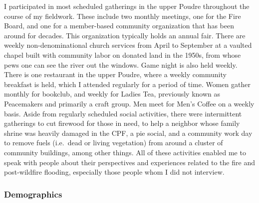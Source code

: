\documentclass[
]{article}
\begin{document}
I participated in most scheduled gatherings in the upper Poudre throughout the course of my fieldwork. These include two monthly meetings, one for the Fire Board, and one for a member-based community organization that has been around for decades. This organization typically holds an annual fair. There are weekly non-denominational church services from April to September at a vaulted chapel built with community labor on donated land in the 1950s, from whose pews one can see the river out the windows. Game night is also held weekly. There is one restaurant in the upper Poudre, where a weekly community breakfast is held, which I attended regularly for a period of time. Women gather monthly for bookclub, and weekly for Ladies Tea, previously known as Peacemakers and primarily a craft group. Men meet for Men's Coffee on a weekly basis. Aside from regularly scheduled social activities, there were intermittent gatherings to cut firewood for those in need, to help a neighbor whose family shrine was heavily damaged in the CPF, a pie social, and a community work day to remove fuels (i.e.~dead or living vegetation) from around a cluster of community buildings, among other things. All of these activities enabled me to speak with people about their perspectives and experiences related to the fire and post-wildfire flooding, especially those people whom I did not interview.

\subsubsection{Demographics}\label{demographics}
\end{document}
